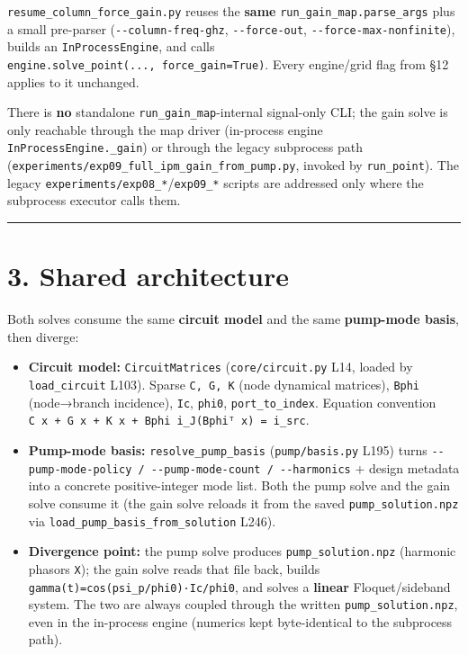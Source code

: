 \documentclass[
  10pt,
]{article}
\providecommand{\tightlist}{%
  \setlength{\itemsep}{0pt}\setlength{\parskip}{0pt}}
\begin{document}
\texttt{resume\_column\_force\_gain.py} reuses the \textbf{same}
\texttt{run\_gain\_map.parse\_args} plus a small pre-parser
(\texttt{-\/-column-freq-ghz}, \texttt{-\/-force-out},
\texttt{-\/-force-max-nonfinite}), builds an \texttt{InProcessEngine},
and calls \texttt{engine.solve\_point(...,\ force\_gain=True)}. Every
engine/grid flag from §12 applies to it unchanged.

There is \textbf{no} standalone \texttt{run\_gain\_map}-internal
signal-only CLI; the gain solve is only reachable through the map driver
(in-process engine \texttt{InProcessEngine.\_gain}) or through the
legacy subprocess path
(\texttt{experiments/exp09\_full\_ipm\_gain\_from\_pump.py}, invoked by
\texttt{run\_point}). The legacy
\texttt{experiments/exp08\_*}/\texttt{exp09\_*} scripts are addressed
only where the subprocess executor calls them.

\begin{center}\rule{0.5\linewidth}{0.5pt}\end{center}

\section{3. Shared architecture}\label{shared-architecture}

Both solves consume the same \textbf{circuit model} and the same
\textbf{pump-mode basis}, then diverge:

\begin{itemize}
\tightlist
\item
  \textbf{Circuit model:} \texttt{CircuitMatrices}
  (\texttt{core/circuit.py} L14, loaded by \texttt{load\_circuit} L103).
  Sparse \texttt{C,\ G,\ K} (node dynamical matrices), \texttt{Bphi}
  (node→branch incidence), \texttt{Ic}, \texttt{phi0},
  \texttt{port\_to\_index}. Equation convention
  \texttt{C\ x\textquotesingle{}\textquotesingle{}\ +\ G\ x\textquotesingle{}\ +\ K\ x\ +\ Bphi\ i\_J(Bphiᵀ\ x)\ =\ i\_src}.
\item
  \textbf{Pump-mode basis:} \texttt{resolve\_pump\_basis}
  (\texttt{pump/basis.py} L195) turns
  \texttt{-\/-pump-mode-policy\ /\ -\/-pump-mode-count\ /\ -\/-harmonics}
  + design metadata into a concrete positive-integer mode list. Both the
  pump solve and the gain solve consume it (the gain solve reloads it
  from the saved \texttt{pump\_solution.npz} via
  \texttt{load\_pump\_basis\_from\_solution} L246).
\item
  \textbf{Divergence point:} the pump solve produces
  \texttt{pump\_solution.npz} (harmonic phasors \texttt{X}); the gain
  solve reads that file back, builds
  \texttt{gamma(t)=cos(psi\_p/phi0)·Ic/phi0}, and solves a
  \textbf{linear} Floquet/sideband system. The two are always coupled
  through the written \texttt{pump\_solution.npz}, even in the
  in-process engine (numerics kept byte-identical to the subprocess
  path).
\end{itemize}
\end{document}
